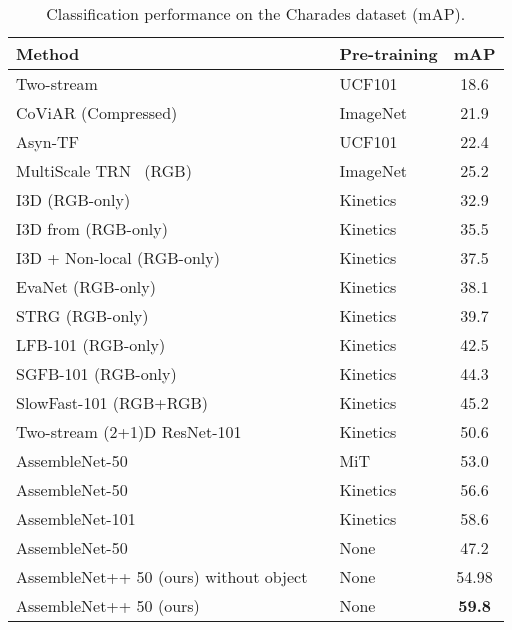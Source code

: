 \documentclass[runningheads]{llncs}
\begin{document}
\begin{table}[t]
\begin{center}
\caption{Classification performance on the Charades dataset (mAP).}
\label{tab:charades}
\begin{tabular}{|l|l|c|}
\hline
Method &  Pre-training  & mAP \\                         
\hline
Two-stream~\cite{sigurdsson2016asynchronous}  & UCF101 &18.6 \\
CoViAR \cite{wu2018compressed} (Compressed) & ImageNet & 21.9 \\
    Asyn-TF \cite{sigurdsson2016asynchronous} & UCF101 & 22.4 \\
    MultiScale TRN~\cite{zhou2018temporal} (RGB) & ImageNet & 25.2 \\
    I3D \cite{carreira2017quo} (RGB-only) & Kinetics &32.9 \\
    I3D from \cite{wang2018non} (RGB-only) & Kinetics &35.5 \\
    I3D + Non-local \cite{wang2018non} (RGB-only) & Kinetics &37.5 \\
    EvaNet \cite{piergiovanni2018evolving} (RGB-only) & Kinetics & 38.1 \\
    STRG \cite{wang2018videos} (RGB-only) & Kinetics & 39.7 \\
    LFB-101 \cite{wu2018long} (RGB-only) & Kinetics & 42.5 \\
    SGFB-101 \cite{ji2020genome} (RGB-only) & Kinetics & 44.3 \\
    SlowFast-101 \cite{feichtenhofer2018slowfast} (RGB+RGB) & Kinetics & 45.2 \\
    Two-stream (2+1)D ResNet-101  & Kinetics & 50.6 \\
AssembleNet-50~\cite{ryoo2019assemblenet}  & MiT & 53.0  \\
    AssembleNet-50~\cite{ryoo2019assemblenet}  & Kinetics & 56.6  \\
    AssembleNet-101~\cite{ryoo2019assemblenet}  & Kinetics & 58.6  \\
\hline
AssembleNet-50~\cite{ryoo2019assemblenet} & None & 47.2 \\
\hline
AssembleNet++ 50 (ours) without object~~ & None  & 54.98 \\ 
AssembleNet++ 50 (ours) & None  & \textbf{59.8} \\  
   
\hline
\end{tabular}
\end{center}
\end{table}
\end{document}
